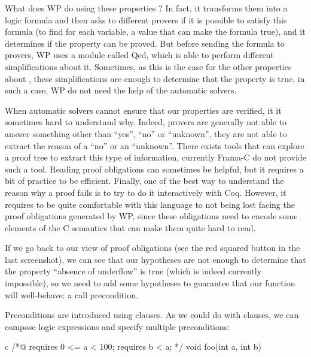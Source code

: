 What does WP do using these properties ? In fact, it transforms them
into a logic formula and then asks to different provers if it is
possible to satisfy this formula (to find for each variable, a value
that can make the formula true), and it determines if the property can
be proved. But before sending the formula to provers, WP uses a module
called Qed, which is able to perform different simplifications about it.
Sometimes, as this is the case for the other properties about
, these simplifications are enough to determine that the
property is true, in such a case, WP do not need the help of the
automatic solvers.



When automatic solvers cannot ensure that our properties are verified,
it it sometimes hard to understand why. Indeed, provers are generally
not able to answer something other than ``yes'', ``no'' or ``unknown'',
they are not able to extract the reason of a ``no'' or an ``unknown''.
There exists tools that can explore a proof tree to extract this type of
information, currently Frama-C do not provide such a tool. Reading proof
obligations can sometimes be helpful, but it requires a bit of practice
to be efficient. Finally, one of the best way to understand the reason
why a proof fails is to try to do it interactively with Coq. However, it
requires to be quite comfortable with this language to not being lost
facing the proof obligations generated by WP, since these obligations
need to encode some elements of the C semantics that can make them quite
hard to read.



If we go back to our view of proof obligations (see the red squared button
in the last screenshot), we can see that our hypotheses are not enough
to determine that the property ``absence of underflow'' is true (which
is indeed currently impossible), so we need to add some hypotheses to
guarantee that our function will well-behave: a call precondition.






Preconditions are introduced using  clauses. As we
could do with  clauses, we can compose logic expressions
and specify multiple preconditions:



\begin{CodeBlock}{c}
/*@
  requires 0 <= a < 100;
  requires b < a;
*/
void foo(int a, int b){
  
}
\end{CodeBlock}



